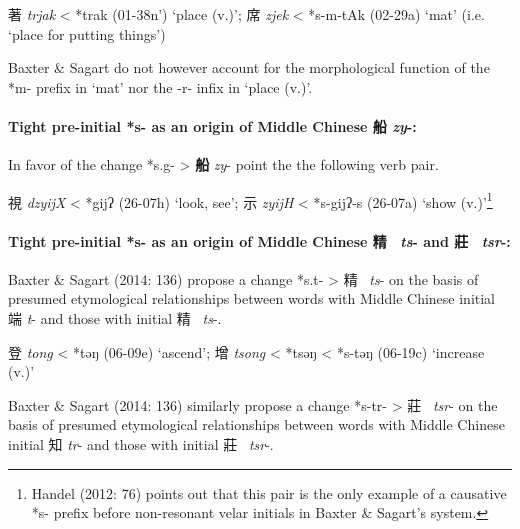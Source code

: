 \begin{description} \item
著 \emph{trjak} \textless{} *trak (01-38n') `place (v.)'; 席  \emph{zjek}
\textless{} *s-m-tAk (02-29a) `mat' (i.e. `place for putting things')
\end{description}

Baxter \& Sagart do not however account for the morphological function
of the *m- prefix in `mat' nor the -r- infix in `place (v.)'.

\paragraph{Tight pre-initial *s- as an origin of Middle Chinese
\textbf{船}  \emph{\textbf{zy}}-: }In favor of the change *s.g-
\textgreater{} \textbf{船}  \emph{zy}- 
\citet[56]{Baxter2014OldChinese} point the the following verb pair.

\begin{description} \item
視 \emph{dzyijX} \textless{} *gijʔ (26-07h) `look, see'; 示  \emph{zyijH}
\textless{} *s-gijʔ-s (26-07a) `show (v.)'\footnote{Handel (2012: 76)
  points out that this pair is the only example of a causative *s-
  prefix before non-resonant velar initials in Baxter \& Sagart's
  system.}
\end{description}

\paragraph{Tight pre-initial *s- as an origin
of Middle Chinese \textbf{精~} \emph{ts}- and
莊~ \emph{tsr}-:}
Baxter \& Sagart (2014:
136) propose a change *s.t{}- \textgreater{} 精~ \emph{ts}- on the basis
of presumed etymological relationships between words with Middle Chinese
initial 端 \emph{t}- and those with initial 精~ \emph{ts}-.

\begin{description} \item
登 \emph{tong} \textless{} *t{}əŋ (06-09e) `ascend'; 增 \emph{tsong}
\textless{} *ts{}əŋ \textless{} *s-t{}əŋ (06-19c) `increase (v.)'
\end{description}

Baxter \& Sagart (2014: 136) similarly propose a change *s-t{}r-
\textgreater{} 莊~ \emph{tsr}- on the basis of presumed etymological
relationships between words with Middle Chinese initial 知  \emph{tr}-
and those with initial 莊~ \emph{tsr}-.

